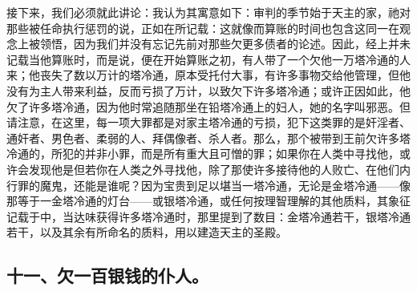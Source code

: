 接下来，我们必须就此讲论：我认为其寓意如下：审判的季节始于天主的家，祂对那些被任命执行惩罚的说，正如在所记载：这就像而算账的时间也包含这同一在观念上被领悟，因为我们并没有忘记先前对那些欠更多债者的论述。因此，经上并未记载当他算账时，而是说，便在开始算账之初，有人带了一个欠他一万塔冷通的人来；他丧失了数以万计的塔冷通，原本受托付大事，有许多事物交给他管理，但他没有为主人带来利益，反而亏损了万计，以致欠下许多塔冷通；或许正因如此，他欠了许多塔冷通，因为他时常追随那坐在铅塔冷通上的妇人，她的名字叫邪恶。但请注意，在这里，每一项大罪都是对家主塔冷通的亏损，犯下这类罪的是奸淫者、通奸者、男色者、柔弱的人、拜偶像者、杀人者。那么，那个被带到王前欠许多塔冷通的，所犯的并非小罪，而是所有重大且可憎的罪；如果你在人类中寻找他，或许会发现他是但若你在人类之外寻找他，除了那使许多接待他的人败亡、在他们内行罪的魔鬼，还能是谁呢？因为宝贵到足以堪当一塔冷通，无论是金塔冷通——像那等于一金塔冷通的灯台——或银塔冷通，或任何按理智理解的其他质料，其象征记载于中，当达味获得许多塔冷通时，那里提到了数目：金塔冷通若干，银塔冷通若干，以及其余有所命名的质料，用以建造天主的圣殿。\par


\subsection{十一、欠一百银钱的仆人。}

